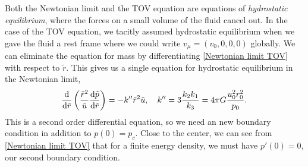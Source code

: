 Both the Newtonian limit and the TOV equation are equations of \emph{hydrostatic equilibrium}, where the forces on a small volume of the fluid cancel out.
In the case of the TOV equation, we tacitly assumed hydrostatic equilibrium when we gave the fluid a rest frame where we could write $v_\mu = (v_0, 0, 0, 0)$ globally.
We can eliminate the equation for mass by differentiating \autoref{Newtonian limit TOV} with respect to $\tilde r$.
This gives us a single equation for hydrostatic equilibrium in the Newtonian limit,
%
\begin{equation}
    \label{Newtonian limit TOV single equation}
    \odv{}{\tilde r} 
    \left( \frac{\tilde r^2}{\tilde u} \odv{\tilde p}{\tilde r}\right) 
    = -  k'' \tilde r^2  \tilde u, \quad
    k'' = 3 \frac{k_2 k_1}{k_3} = 4 \pi G \frac{u_0^2 r^2_0}{p_0}.
\end{equation}
This is a second order differential equation, so we need an new boundary condition in addition to $p(0) = p_c$.
Close to the center, we can see from \autoref{Newtonian limit TOV} that for a finite energy density, we must have $p'(0) = 0$, our second boundary condition.

